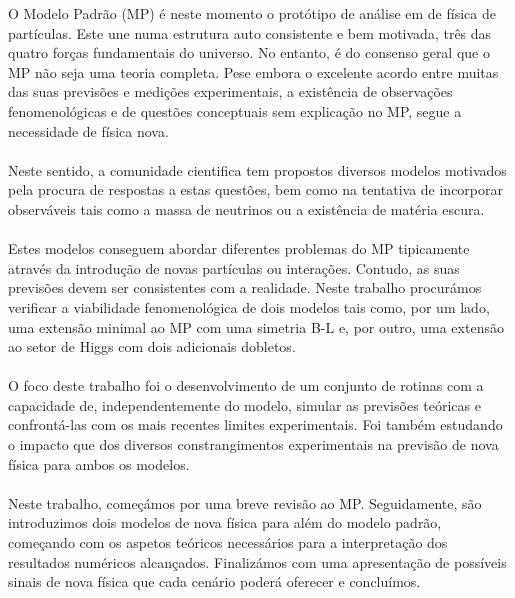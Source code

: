 \documentclass[10pt]{report}
\begin{document}
\TitlePage
\vspace*{55mm}
{O Modelo Padrão (MP) é neste momento o protótipo de análise em de física de partículas. 
%
Este une numa estrutura auto consistente e bem motivada, três das quatro forças fundamentais do universo. 
%
No entanto, é do consenso geral que o MP não seja uma teoria completa. 
%
Pese embora o excelente acordo entre muitas das suas previsões e medições experimentais, a existência de observações fenomenológicas e de questões conceptuais sem explicação no MP, segue a necessidade de física nova. 
\\ \ \\ 
Neste sentido, a comunidade cientifica tem propostos diversos modelos motivados pela procura de respostas a estas questões, bem como na tentativa de incorporar observáveis tais como a massa de neutrinos ou a existência de matéria escura.
\\ \ \\ 
Estes modelos conseguem abordar diferentes problemas do MP tipicamente através da introdução de novas partículas ou interações. 
%
Contudo, as suas previsões devem ser consistentes com a realidade. 
%
Neste trabalho procurámos verificar a viabilidade fenomenológica de dois modelos tais como, por um lado, uma extensão minimal ao MP com uma simetria B-L e, por outro, uma extensão ao setor de Higgs com dois adicionais dobletos.
\\ \ \\
O foco deste trabalho foi o desenvolvimento de um conjunto de rotinas com a capacidade de, independentemente do modelo, simular as previsões teóricas e confrontá-las com os mais recentes limites experimentais.
%
Foi também estudando o impacto que dos diversos constrangimentos experimentais na previsão de nova física para ambos os modelos.
\\ \ \\ 
Neste trabalho, começámos por uma breve revisão ao MP. Seguidamente, são introduzimos dois modelos de nova física para além do modelo padrão, começando com os aspetos teóricos necessários para a interpretação dos resultados numéricos alcançados. Finalizámos com uma apresentação de possíveis sinais de nova física que cada cenário poderá oferecer e concluímos.
}
\EndTitlePage
\titlepage\ \endtitlepage %
\end{document}
